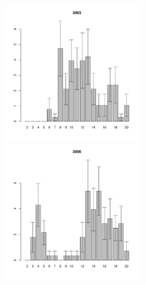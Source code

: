 \begin{figure}[hp]
\begin{minipage}[b]{.3\linewidth}
\begin{center}
	\end{center}
	\end{minipage}
	\begin{minipage}[b]{.3\linewidth}
	\begin{center}
	\includegraphics[width=60mm]{../Barenc_Sea/Dalnezeleneckaya/DZ2_2003_.pdf}
	\end{center}
	\end{minipage}
	\hfill
	\begin{minipage}[b]{.3\linewidth}
	\begin{center}
	\includegraphics[width=60mm]{../Barenc_Sea/Dalnezeleneckaya/DZ2_2006_.pdf}
	\end{center}
	\end{minipage}
	\hfill
	\begin{minipage}[b]{.3\linewidth}
	\begin{center}
	

\end{center}
\end{minipage}
\end{figure}
